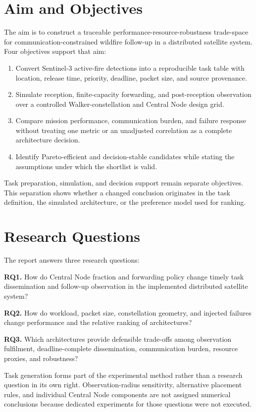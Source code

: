\section{Aim and Objectives}
The aim is to construct a traceable performance-resource-robustness trade-space for communication-constrained wildfire follow-up in a distributed satellite system. Four objectives support that aim:

\begin{enumerate}
\item Convert Sentinel-3 active-fire detections into a reproducible task table with location, release time, priority, deadline, packet size, and source provenance.
\item Simulate reception, finite-capacity forwarding, and post-reception observation over a controlled Walker-constellation and Central Node design grid.
\item Compare mission performance, communication burden, and failure response without treating one metric or an unadjusted correlation as a complete architecture decision.
\item Identify Pareto-efficient and decision-stable candidates while stating the assumptions under which the shortlist is valid.
\end{enumerate}
Task preparation, simulation, and decision support remain separate objectives. This separation shows whether a changed conclusion originates in the task definition, the simulated architecture, or the preference model used for ranking.

\section{Research Questions}
The report answers three research questions:

\textbf{RQ1.} How do Central Node fraction and forwarding policy change timely task dissemination and follow-up observation in the implemented distributed satellite system?

\textbf{RQ2.} How do workload, packet size, constellation geometry, and injected failures change performance and the relative ranking of architectures?

\textbf{RQ3.} Which architectures provide defensible trade-offs among observation fulfilment, deadline-complete dissemination, communication burden, resource proxies, and robustness?

Task generation forms part of the experimental method rather than a research question in its own right. Observation-radius sensitivity, alternative placement rules, and individual Central Node components are not assigned numerical conclusions because dedicated experiments for those questions were not executed.

